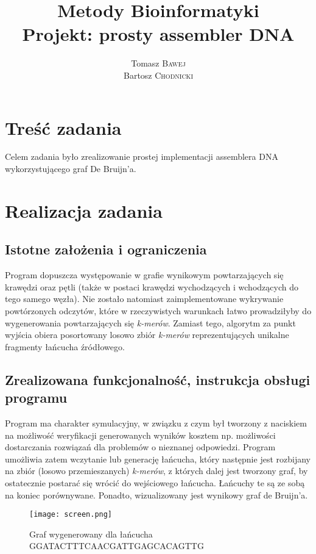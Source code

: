 \documentclass{article}
\title{Metody Bioinformatyki \\ Projekt: prosty assembler DNA } %
\author{Tomasz \textsc{Bawej} \\ Bartosz \textsc{Chodnicki}} %
\begin{document}
\maketitle %

\setlength\parindent{0pt} %

\renewcommand{\labelenumi}{\alph{enumi}.} %

\section{Treść zadania}
Celem zadania było zrealizowanie prostej implementacji assemblera DNA wykorzystującego graf De Bruijn'a.

\section{Realizacja zadania}
\subsection{Istotne założenia i ograniczenia}
Program dopuszcza występowanie w grafie wynikowym powtarzających się krawędzi oraz pętli (także w postaci krawędzi wychodzących i wchodzących do tego samego węzła). Nie zostało natomiast zaimplementowane wykrywanie powtórzonych odczytów, które w rzeczywistych warunkach łatwo prowadziłyby do wygenerowania powtarzających się \textit{k-merów}. Zamiast tego, algorytm za punkt wyjścia obiera posortowany losowo zbiór \textit{k-merów} reprezentujących unikalne fragmenty łańcucha źródłowego.
\subsection{Zrealizowana funkcjonalność, instrukcja obsługi programu}
Program ma charakter symulacyjny, w związku z czym był tworzony z naciskiem na możliwość weryfikacji generowanych wyników kosztem np. możliwości dostarczania rozwiązań dla problemów o nieznanej odpowiedzi. Program umożliwia zatem wczytanie lub generację łańcucha, który następnie jest rozbijany na zbiór (losowo przemieszanych) \textit{k-merów}, z których dalej jest tworzony graf, by ostatecznie postarać się wrócić do wejściowego łańcucha. Łańcuchy te są ze sobą na koniec porównywane. Ponadto, wizualizowany jest wynikowy graf de Bruijn'a.
\begin{figure}[h!]
\caption{Graf wygenerowany dla łańcucha GGATACTTTCAACGATTGAGCACAGTTG}
\texttt{[image: screen.png]} 
\end{figure}
\end{document}
